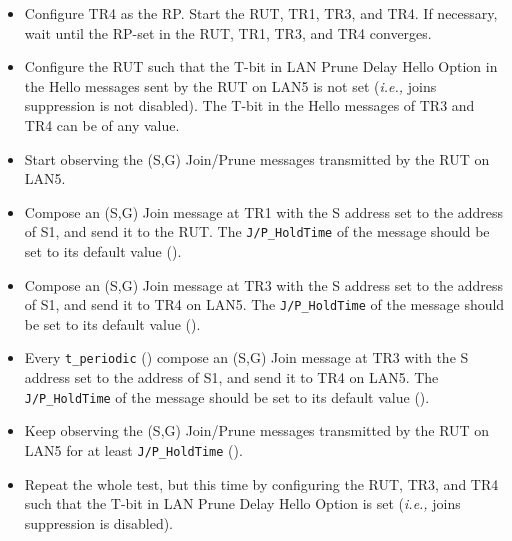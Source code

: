 \documentclass[11pt]{report}
\newcommand{\ie}{\emph{i.e.,}\xspace}
\begin{document}
\begin{itemize}

  \item Configure TR4 as the RP. Start the RUT, TR1, TR3, and TR4. If
  necessary, wait until the RP-set in the RUT, TR1, TR3, and TR4
  converges.

  \item Configure the RUT such that the T-bit in LAN Prune Delay Hello
  Option in the Hello messages sent by the RUT on LAN5 is not set (\ie joins
  suppression is not disabled). The T-bit in the Hello messages of TR3 and TR4
  can be of any value.

  \item Start observing the (S,G) Join/Prune messages transmitted by the
  RUT on LAN5.

  \item Compose an (S,G) Join message at TR1 with the S address set to the
  address of S1, and send it to the RUT. 
  The \verb=J/P_HoldTime= of the message should be set to its default
  value ({\PimsmJPHoldTime}).

  \item Compose an (S,G) Join message at TR3 with the S address set to the
  address of S1, and send it to TR4 on LAN5.
  The \verb=J/P_HoldTime= of the message should be set to its default
  value ({\PimsmJPHoldTime}).

  \item Every \verb=t_periodic= ({\PimsmTPeriodic}) compose an (S,G) Join
  message at TR3 with the S address set to the address of S1, and send it to
  TR4 on LAN5.
  The \verb=J/P_HoldTime= of the message should be set to its default
  value ({\PimsmJPHoldTime}).

  \item Keep observing the (S,G) Join/Prune messages transmitted by the
  RUT on LAN5 for at least \verb=J/P_HoldTime= ({\PimsmJPHoldTime}).

  \item Repeat the whole test, but this time by configuring the RUT, TR3, and
  TR4 such that the T-bit in LAN Prune Delay Hello Option is set (\ie joins
  suppression is disabled).

\end{itemize}

\end{document}
